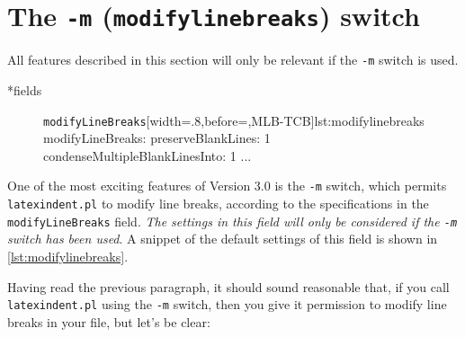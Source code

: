 
\section{The \texttt{-m} (\texttt{modifylinebreaks}) switch}\label{sec:modifylinebreaks}
 All features described in this section will only be relevant if the \texttt{-m} switch
 is used.

*{fields}
	\begin{figure}
		\begin{yaml}[numbers=none]{\texttt{modifyLineBreaks}}[width=.8\linewidth,before=\centering,MLB-TCB]{lst:modifylinebreaks}
modifyLineBreaks:
    preserveBlankLines: 1
    condenseMultipleBlankLinesInto: 1
   ...
	\end{yaml}
	\end{figure}
	One of the most exciting features of Version 3.0 is the \texttt{-m} switch, which
	permits \texttt{latexindent.pl} to modify line breaks, according to the
	specifications in the \texttt{modifyLineBreaks} field. \emph{The settings
		in this field will only be considered if the \texttt{-m} switch has been used}.
	A snippet of the default settings of this field is shown in \cref{lst:modifylinebreaks}.

	Having read the previous paragraph, it should sound reasonable that, if you call \texttt{latexindent.pl}
	using the \texttt{-m} switch, then you give it permission to modify line breaks in your file,
	but let's be clear:

